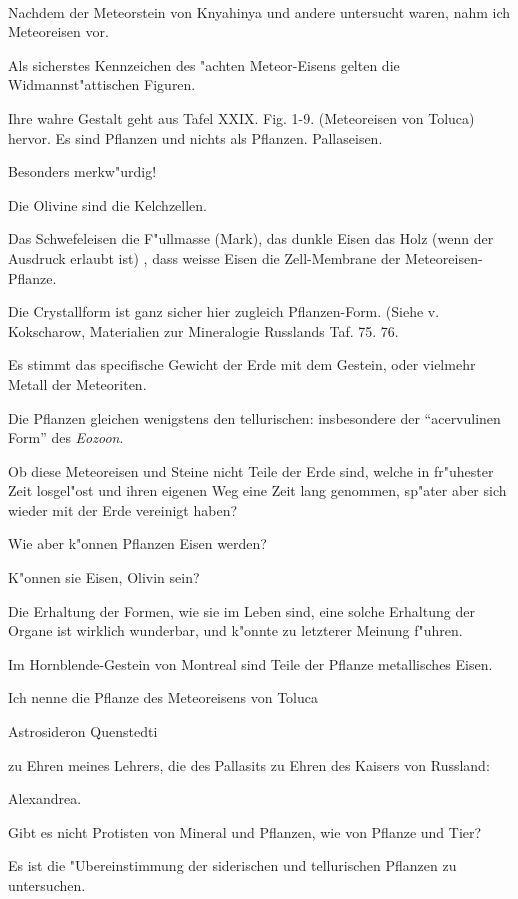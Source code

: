 \documentclass[a4paper, 11pt, oneside, german]{article}
\begin{document}
\paragraph{}
Nachdem der Meteorstein von Knyahinya und andere untersucht waren, nahm ich Meteoreisen vor.

Als sicherstes Kennzeichen des "achten Meteor-Eisens gelten die Widmannst"attischen Figuren.

Ihre wahre Gestalt geht aus Tafel XXIX. Fig. 1-9. (Meteoreisen von Toluca) hervor. Es sind Pflanzen und nichts als Pflanzen.
Pallaseisen.

Besonders merkw"urdig!

Die Olivine sind die Kelchzellen.

Das Schwefeleisen die F"ullmasse (Mark), das dunkle Eisen das Holz (wenn der Ausdruck erlaubt ist) , dass weisse Eisen die Zell-Membrane der Meteoreisen-Pflanze.

Die Crystallform ist ganz sicher hier zugleich Pflanzen-Form. (Siehe v. Kokscharow, Materialien zur Mineralogie Russlands Taf. 75. 76.

Es stimmt das specifische Gewicht der Erde mit dem Gestein, oder vielmehr Metall der Meteoriten.

Die Pflanzen gleichen wenigstens den tellurischen: insbesondere der "`acervulinen Form"' des \emph{Eozoon}.

Ob diese Meteoreisen und Steine nicht Teile der Erde sind, welche in fr"uhester Zeit losgel"ost und ihren eigenen Weg eine Zeit lang genommen, sp"ater aber sich wieder mit der Erde vereinigt haben?

Wie aber k"onnen Pflanzen Eisen werden?

K"onnen sie Eisen, Olivin sein?

Die Erhaltung der Formen, wie sie im Leben sind, eine solche Erhaltung der Organe ist wirklich wunderbar, und k"onnte zu letzterer Meinung f"uhren.

Im Hornblende-Gestein von Montreal sind Teile der Pflanze metallisches Eisen.

Ich nenne die Pflanze des Meteoreisens von Toluca

Astrosideron Quenstedti

zu Ehren meines Lehrers, die des Pallasits zu Ehren des Kaisers von Russland:

Alexandrea.

Gibt es nicht Protisten von Mineral und Pflanzen, wie von Pflanze und Tier?

Es ist die "Ubereinstimmung der siderischen und tellurischen Pflanzen zu untersuchen.
\end{document}
